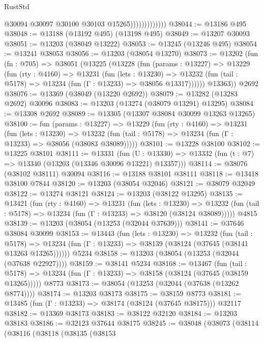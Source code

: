 \begin{lexlean}{RustStd}
\begin{coremodule}
                              @30094
                              @30097
                              @30100
                              @30103
                              @15265)))))))))))))
@38044 := @13186 @495
@38048 := @13188 (@13192 @495) (@13198 @495)
@38049 := @13207 @30093
@38051 := @13203 (@38049 @13222)
@38053 := @13245 (@13246 @495)
@38054 := @13241 @38053
@38056 := @13203 (@38054 @13270)
@38073 := @13202
    (fun (fn : @705) =>
    @38051
      (@13225
        (@13228
          (fun (params : @13227) =>
          @13229
            (fun (rty : @4160) =>
            @13231
              (fun (lets : @13230) =>
              @13232 (fun (tail : @5178) => @13234 (fun (Γ : @13233) => @38056 @13317))))))
        @13363))
    @2692
@38076 := @13369 (@38049 (@13220 @2692))
@38079 := @13282 (@13283 @2692) @30096
@38083 := @13203 (@13274 (@38079 @13291) @13295)
@38084 := @13308 @2692
@38089 := @13305 (@13307 @38084 @30099 @13263 @13265)
@38100 := fun (params : @13227) =>
  @13229
    (fun (rty : @4160) =>
    @13231
      (fun (lets : @13230) =>
      @13232 (fun (tail : @5178) => @13234 (fun (Γ : @13233) => @38056 (@38083 @38089)))))
@38101 := @13228 @38100
@38102 := @13225 @38101
@38111 := @13331
    (fun (U : @13330) => @13332 (fun (t : @7) => @13340 (@13203 (@13346 @30096 @13221) @13357)))
@38114 := @38076 (@38102 @38111) @30094
@38116 := @13188 @38101 @38111
@38118 := @13418 @38100 @7844
@38120 := @13203 (@38054 @32046)
@38121 := @38079 @32049
@38122 := @13274 @38121
@38124 := @13203 (@38122 @13295)
@38135 := @13421
    (fun (rty : @4160) =>
    @13231
      (fun (lets : @13230) =>
      @13232 (fun (tail : @5178) => @13234 (fun (Γ : @13233) => @38120 (@38124 @38089)))))
    @4815
@38139 := @13203 (@38054 (@13253 (@32044 @37639)))
@38141 := @37646 @38084 @30099
@38153 := @13443
    (fun (lets : @13230) =>
    @13232
      (fun (tail : @5178) =>
      @13234 (fun (Γ : @13233) => @38139 (@38124 (@37645 (@38141 @13263 @13265))))))
    @5234
@38158 := @13203 (@38054 (@13253 (@32044 (@37638 @22927))))
@38159 := @38141 @5234
@38168 := @13467
    (fun (tail : @5178) => @13234 (fun (Γ : @13233) => @38158 (@38124 (@37645 (@38159 @13265)))))
    @8773
@38173 := @38054 (@13253 (@32044 (@37638 (@13262 @8774))))
@38174 := @13203 @38173
@38175 := @38159 @8773
@38181 := @13485 (fun (Γ : @13233) => @38174 (@38124 (@37645 @38175))) @32117
@38182 := @13369 @38173
@38183 := @38122 @32120
@38184 := @13203 @38183
@38186 := @32123 @37644 @38175
@38245 := @38048
    (@38073
      (@38114
        (@38116
          (@38118
            (@38135
              (@38153

\end{coremodule}
\end{lexlean}
